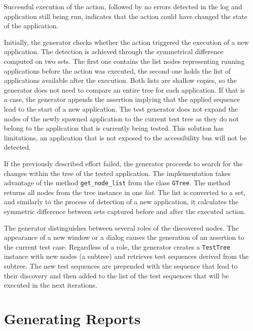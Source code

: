 Successful execution of the action, followed by no errors detected in the log and application still being run, indicates that the action could have changed the state of the application. 

Initially, the generator checks whether the action triggered the execution of a new application. The detection is achieved through the symmetrical difference computed on two sets. The first one contains the list nodes representing running applications before the action was executed, the second one holds the list of applications available after the execution. Both lists are shallow copies, so the generator does not need to compare an entire tree for each application. If that is a case, the generator appends the assertion implying that the applied sequence lead to the start of a new application. The test generator does not expand the nodes of the newly spawned application to the current test tree as they do not belong to the application that is currently being tested. This solution has limitations, an application that is not exposed to the accessibility bus will not be detected.

If the previously described effort failed, the generator proceeds to search for the changes within the tree of the tested application. The implementation takes advantage of the method \texttt{get\_node\_list} from the class \texttt{GTree}. The method returns all nodes from the tree instance in one \textit{list}. The list is converted to a set, and similarly to the process of detection of a new application, it calculates the symmetric difference between sets captured before and after the executed action. 

The generator distinguishes between several roles of the discovered nodes. The appearance of a new window or a dialog causes the generation of an assertion to the current test case. Regardless of a role, the generator creates a \texttt{TestTree} instance with new nodes (a subtree) and retrieves test sequences derived from the subtree. The new test sequences are prepended with the sequence that lead to their discovery and then added to the list of the test sequences that will be executed in the next iterations.

\section{Generating Reports}

